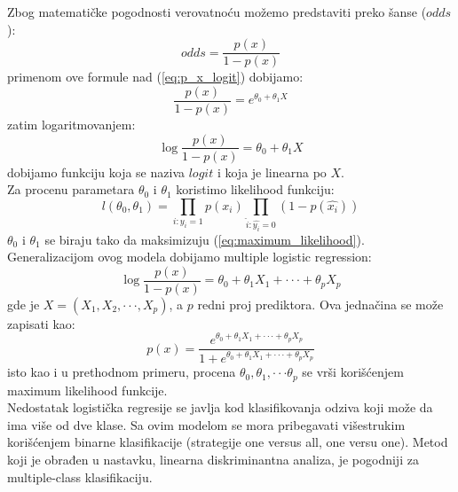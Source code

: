 Zbog matematičke pogodnosti verovatnoću možemo predstaviti preko šanse ($odds$):
\begin{equation}
  odds = \frac{p\left(x\right)}{1-p\left(x\right)}
\end{equation}
primenom ove formule nad (\ref{eq:p_x_logit}) dobijamo:
\begin{equation}
  \frac{p\left(x\right)}{1-p\left(x\right)} = e^{\theta_0 + \theta_1  X}
\end{equation}
zatim logaritmovanjem:
\begin{equation}
  \log \frac{p\left(x\right)}{1-p\left(x\right)} = \theta_0+ \theta_1 X
\end{equation}
dobijamo funkciju koja se naziva $logit$ i koja je linearna po $X$. \\

Za procenu parametara $\theta_0$ i $\theta_1$ koristimo likelihood funkciju:
\begin{equation} \label{eq:maximum_likelihood}
  l\left(\theta_0, \theta_1\right) =
  \prod_{i:y_i = 1} p\left(x_i\right)
  \prod_{\hat{i}:\hat{y_i} = 0} \left(1 - p\left(\hat{x_i}\right)\right)
\end{equation}
$\theta_0$ i $\theta_1$ se biraju tako da maksimizuju (\ref{eq:maximum_likelihood}). \\

Generalizacijom ovog modela dobijamo multiple logistic regression:
\begin{equation}
  \log \frac{p\left(x\right)}{1-p\left(x\right)} = \theta_0+ \theta_1 X_1 + \cdot\cdot\cdot + \theta_p X_p
\end{equation}
gde je $X = (X_1, X_2, \cdot\cdot\cdot, X_p)$, a $p$ redni proj prediktora.
Ova jednačina se može zapisati kao:
\begin{equation} \label{eq:logistic_function}
  p(x) = \frac{e^{\theta_0 + \theta_1 X_1 + \cdot\cdot\cdot + \theta_p X_p}}{1 + e^{\theta_0 + \theta_1  X_1 + \cdot\cdot\cdot + \theta_p X_p}}
\end{equation}
isto kao i u prethodnom primeru, procena $\theta_0, \theta_1, \cdot\cdot\cdot \theta_p$ se vrši
korišćenjem maximum likelihood funkcije. \\

Nedostatak logistička regresije se javlja kod klasifikovanja odziva koji može da
ima više od dve klase. Sa ovim modelom se mora pribegavati višestrukim
korišćenjem binarne klasifikacije (strategije one versus all, one versu one).
Metod koji je obrađen u nastavku, linearna diskriminantna analiza, je pogodniji
za multiple-class klasifikaciju. \\
